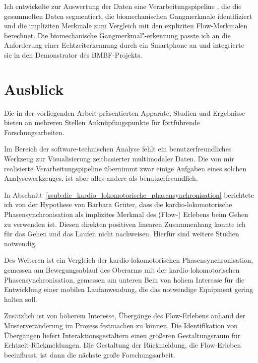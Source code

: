 Ich entwickelte zur Auswertung der Daten eine Verarbeitungspipeline \citep{Bogutzky2016a}, die die gesammelten Daten segmentiert, die biomechanischen Gangmerkmale identifiziert und die impliziten Merkmale zum Vergleich mit den expliziten Flow-Merkmalen berechnet. Die biomechanische Gangmerkmal"-erkennung passte ich an die Anforderung einer Echtzeiterkennung durch ein Smartphone an und integrierte sie in den Demonstrator des \acs{BMBF}-Projekts. 

\section{Ausblick} \label{sec:ausblick} Die in der vorliegenden Arbeit präsentierten Apparate, Studien und Ergebnisse bieten an mehreren Stellen Anknüpfungspunkte für fortführende Forschungsarbeiten.

Im Bereich der software-technischen Analyse fehlt ein benutzerfreundliches Werkzeug zur Visualisierung zeitbasierter multimodaler Daten. Die von mir realisierte Verarbeitungspipeline übernimmt zwar einige Aufgaben eines solchen Analysewerkzeuges, ist aber alles andere als benutzerfreundlich. 

In Abschnitt~\ref{ssub:die_kardio_lokomotorische_phasensynchronisation} berichtete ich von der Hypothese von Barbara Grüter, dass die kardio-lokomotorische Phasensynchronisation als implizites Merkmal des (Flow-) Erlebens beim Gehen zu verwenden ist. Diesen direkten positiven linearen Zusammenhang konnte ich für das Gehen und das Laufen nicht nachweisen. Hierfür sind weitere Studien notwendig.

Des Weiteren ist ein Vergleich der kardio-lokomotorischen Phasensynchronisation, gemessen am Bewegungsablauf des Oberarms mit der kardio-lokomotorischen Phasensynchronisation, gemessen am unteren Bein von hohem Interesse für die Entwicklung einer mobilen Laufanwendung, die das notwendige Equipment gering halten soll.

Zusätzlich ist von höherem Interesse, Übergänge des Flow-Erlebens anhand der Musterveränderung im Prozess festmachen zu können. Die Identifikation von Übergängen liefert Interaktionsgestaltern einen größeren Gestaltungsraum für Echtzeit-Rückmeldungen. Die Gestaltung der Rückmeldung, die Flow-Erleben beeinflusst, ist dann die nächste große Forschungsarbeit.

